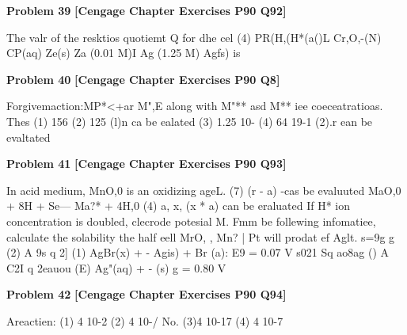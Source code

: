 \begin{problembox}
\textbf{Problem 39} \hfill \textbf{[Cengage Chapter Exercises P90 Q92]}
\label{q:ext-cng-th-39}

The valr of the resktios quotiemt Q for dhe cel
(4) PR(H,(H*(a()L Cr,O,-(N) CP(aq)
Ze(s) Za (0.01 M)I Ag  (1.25 M) Agfs) is
\end{problembox}

\begin{problembox}
\textbf{Problem 40} \hfill \textbf{[Cengage Chapter Exercises P90 Q8]}
\label{q:ext-cng-th-40}

Forgivemaction:MP*<+ar  M",E 
along with M"** asd M** iee coeceatratioas. Thes
(1) 156
(2) 125
(l)n ca be ealated
(3) 1.25   10-
(4) 64   19-1
(2).r ean be evaltated
\end{problembox}

\begin{problembox}
\textbf{Problem 41} \hfill \textbf{[Cengage Chapter Exercises P90 Q93]}
\label{q:ext-cng-th-41}

In acid medium, MnO,0 is an oxidizing ageL.
(7) (r - a) -cas be evaluuted
MaO,0 + 8H  + Se---  Ma?* + 4H,0
(4) a, x, (x * a) can be eraluated
If H* ion concentration is doubled, clecrode potesial 
M. Fmm be follewing infomatiee, calculate the solability
the half eell MrO, , Mn?  | Pt will
prodat ef Aglt.
s=9g g (2) A 9s q 2] (1)
AgBr(x) +  -  Agis) + Br (a):
E9 = 0.07 V
s021 Sq ao8ag () A C2I q 2eauou (E)
Ag"(aq) + 
- (s)
g  = 0.80 V
\end{problembox}

\begin{problembox}
\textbf{Problem 42} \hfill \textbf{[Cengage Chapter Exercises P90 Q94]}
\label{q:ext-cng-th-42}

Areactien:
(1) 4   10-2 (2) 4   10-/ No.  (3)4   10-17 (4) 4   10-7
\end{problembox}

